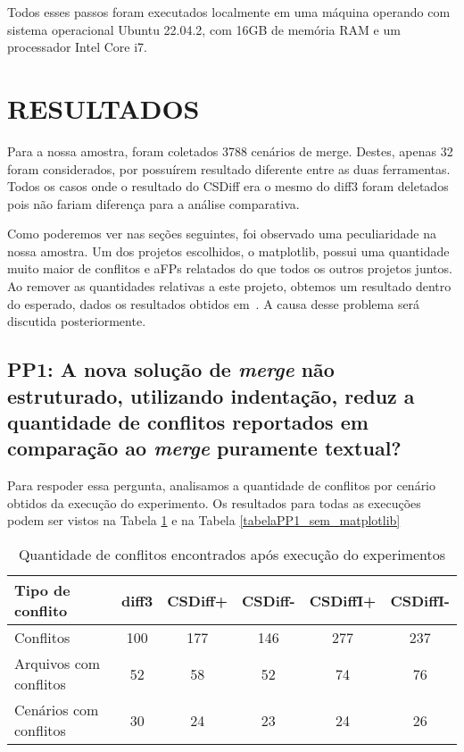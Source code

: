 Todos esses passos foram executados localmente em uma máquina operando com sistema operacional Ubuntu 22.04.2,
com 16GB de memória
RAM e um processador Intel Core i7.

\section{RESULTADOS}
Para a nossa amostra, foram coletados 3788 cenários de merge. Destes, apenas 32 foram considerados, por possuírem resultado
diferente entre as duas ferramentas. Todos os casos onde o resultado do CSDiff era o mesmo do diff3
foram deletados pois não fariam
diferença para a análise comparativa.

Como poderemos ver nas seções seguintes, foi observado uma peculiaridade na nossa amostra. Um dos projetos escolhidos, o
matplotlib, possui uma quantidade muito maior de conflitos e aFPs relatados do que todos os outros projetos juntos. Ao remover
as quantidades relativas a este projeto, obtemos um resultado dentro do esperado, dados os resultados obtidos
em~\cite{clem21,heitor21}. A causa desse problema será discutida posteriormente.

\subsection{PP1: A nova solução de \emph{merge} não estruturado, utilizando indentação,
	reduz a quantidade de conflitos reportados em comparação ao \emph{merge} puramente textual?}
Para respoder essa pergunta, analisamos a quantidade de conflitos por cenário obtidos da execução do experimento. Os
resultados para todas as execuções podem ser vistos na Tabela \ref{tabelaPP1_com_matplotlib} e na
Tabela \ref{tabelaPP1_sem_matplotlib}

\begin{table}[ht]
	\begin{center}
		\begin{tabular}{|l|c|c|c|c|c|}
			\hline
			\textbf{Tipo de conflito} & \textbf{diff3} & \textbf{CSDiff+} & \textbf{CSDiff-} & \textbf{CSDiffI+} & \textbf{CSDiffI-} \\
			\hline
			Conflitos                 & 100            & 177              & 146              & 277               & 237               \\
			Arquivos com conflitos    & 52             & 58               & 52               & 74                & 76                \\
			Cenários com conflitos    & 30             & 24               & 23               & 24                & 26                \\
			\hline
		\end{tabular}
	\end{center}
	\caption{Quantidade de conflitos encontrados após execução do experimentos}\label{tabelaPP1_com_matplotlib}
\end{table}

